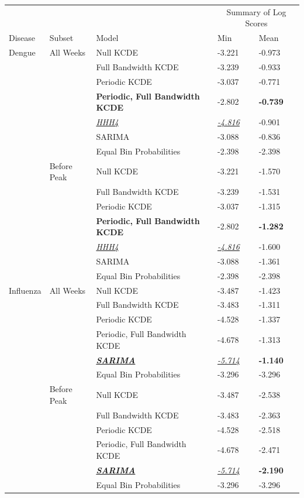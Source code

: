 \documentclass[times, doublespace]{simauth}\usepackage[]{graphicx}\usepackage[]{color}
\begin{document}
\begin{table}[hp]
\centering
\begin{tabular}{lllll}
\toprule
         &                    &          &              \multicolumn{2}{c}{Summary of Log Scores} \\
\cline{4-5}
 Disease & Subset & Model & Min & Mean \\
  \hline
Dengue & All Weeks & Null KCDE & -3.221 & -0.973\\
 &  & Full Bandwidth KCDE & -3.239 & -0.933\\
 &  & Periodic KCDE & -3.037 & -0.771\\
 &  & \textbf{Periodic, Full Bandwidth KCDE} & -2.802 & \textbf{-0.739}\\
 &  & \underline{\emph{HHH4}} & \underline{\emph{-4.816}} & -0.901\\
 &  & SARIMA & -3.088 & -0.836\\
 &  & Equal Bin Probabilities & -2.398 & -2.398\\
\cline{2-5}
 & Before Peak & Null KCDE & -3.221 & -1.570\\
 &  & Full Bandwidth KCDE & -3.239 & -1.531\\
 &  & Periodic KCDE & -3.037 & -1.315\\
 &  & \textbf{Periodic, Full Bandwidth KCDE} & -2.802 & \textbf{-1.282}\\
 &  & \underline{\emph{HHH4}} & \underline{\emph{-4.816}} & -1.600\\
 &  & SARIMA & -3.088 & -1.361\\
 &  & Equal Bin Probabilities & -2.398 & -2.398\\
\midrule
Influenza & All Weeks & Null KCDE & -3.487 & -1.423\\
 &  & Full Bandwidth KCDE & -3.483 & -1.311\\
 &  & Periodic KCDE & -4.528 & -1.337\\
 &  & Periodic, Full Bandwidth KCDE & -4.678 & -1.313\\
 &  & \textbf{\underline{\emph{SARIMA}}} & \underline{\emph{-5.714}} & \textbf{-1.140}\\
 &  & Equal Bin Probabilities & -3.296 & -3.296\\
\cline{2-5}
 & Before Peak & Null KCDE & -3.487 & -2.538\\
 &  & Full Bandwidth KCDE & -3.483 & -2.363\\
 &  & Periodic KCDE & -4.528 & -2.518\\
 &  & Periodic, Full Bandwidth KCDE & -4.678 & -2.471\\
 &  & \textbf{\underline{\emph{SARIMA}}} & \underline{\emph{-5.714}} & \textbf{-2.190}\\
 &  & Equal Bin Probabilities & -3.296 & -3.296\\


\end{tabular}
\end{table}
\end{document}
